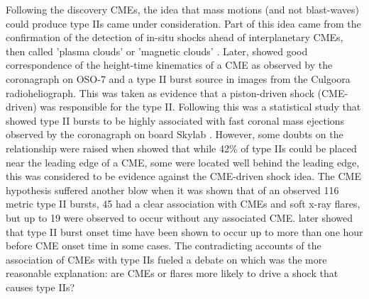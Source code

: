 Following the discovery CMEs, the idea that mass motions (and not blast-waves) could produce type IIs came under consideration. Part of this idea came from the confirmation of the detection of in-situ shocks ahead of interplanetary CMEs, then called 'plasma clouds' or 'magnetic clouds' \citep{hundhausen1972}. Later, \citep{stewart1974} showed good correspondence of the height-time kinematics of a CME as observed by the coronagraph on OSO-7 and a type II burst source in images from the Culgoora radioheliograph. This was taken as evidence that a piston-driven shock (CME-driven) was responsible for the type II. Following this was a statistical study that showed type II bursts to be highly associated with fast coronal mass ejections observed by the coronagraph on board Skylab \citep{gosling1976}. However, some doubts on the relationship were raised when \citep{robinson1985} showed that while 42\% of type IIs could be placed near the leading edge of a CME, some were located well behind the leading edge, this was considered to be evidence against the CME-driven shock idea. The CME hypothesis suffered another blow when
it was shown that of an observed 116 metric type II bursts, 45 had a clear association with CMEs and soft x-ray flares, but up to 19 were observed to occur without any associated CME. \citep{classen2002} later showed that type II burst onset time have been shown to occur up to more than one hour before CME onset time in some cases. The contradicting accounts of the association of CMEs with type IIs fueled a debate on which was the more reasonable explanation: are CMEs or flares more likely to drive a shock that causes type IIs?  
